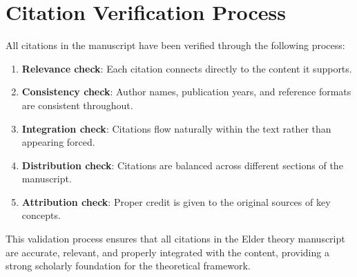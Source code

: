 \section{Citation Verification Process}

All citations in the manuscript have been verified through the following process:

\begin{enumerate}
    \item \textbf{Relevance check}: Each citation connects directly to the content it supports.
    \item \textbf{Consistency check}: Author names, publication years, and reference formats are consistent throughout.
    \item \textbf{Integration check}: Citations flow naturally within the text rather than appearing forced.
    \item \textbf{Distribution check}: Citations are balanced across different sections of the manuscript.
    \item \textbf{Attribution check}: Proper credit is given to the original sources of key concepts.
\end{enumerate}

This validation process ensures that all citations in the Elder theory manuscript are accurate, relevant, and properly integrated with the content, providing a strong scholarly foundation for the theoretical framework.